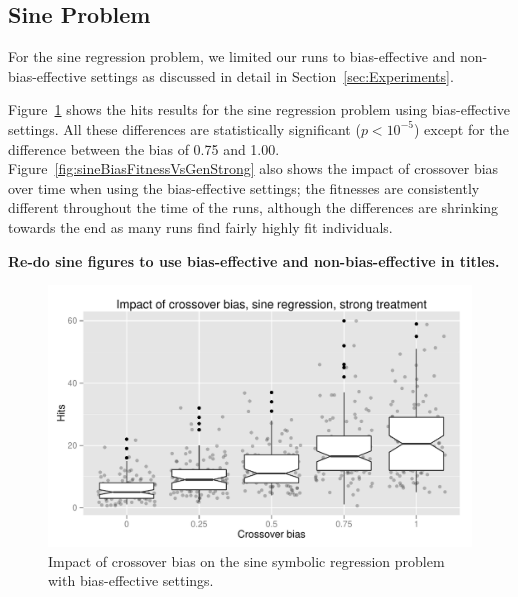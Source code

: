 \documentclass{sig-alternate}
\begin{document}
\subsection{Sine Problem}

For the sine regression problem, we limited our runs to bias-effective
and non-bias-effective settings as discussed in detail in Section~\ref{sec:Experiments}. 

Figure~\ref{fig:sineBiasResultsStrong} shows the hits results for the sine regression problem using bias-effective settings. All these differences are statistically significant ($p < 10^{-5}$) except for the difference between the bias of 0.75 and 1.00. Figure~\ref{fig:sineBiasFitnessVsGenStrong} also shows the impact of crossover bias over time when using the bias-effective settings; the fitnesses are consistently different throughout the time of the runs, although the differences are shrinking towards the end as many runs find fairly highly fit individuals.

\textbf{Re-do sine figures to use bias-effective and non-bias-effective in titles.}

\begin{figure}
\centering
\includegraphics[width=0.45 \textwidth]{Plots/Sine_XO_impact_strong_boxplot.pdf}
\caption{Impact of crossover bias on the sine symbolic regression problem with bias-effective settings.}
\label{fig:sineBiasResultsStrong}
\end{figure}

%
%
%
%

%
%
%
%
\end{document}
